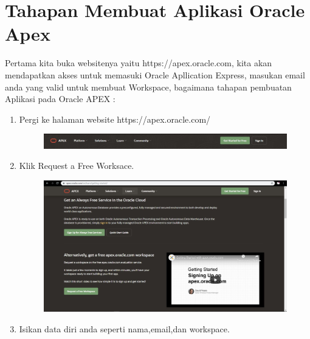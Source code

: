 \section{Tahapan Membuat Aplikasi Oracle Apex}
Pertama kita buka websitenya yaitu https://apex.oracle.com, kita akan mendapatkan akses untuk memasuki Oracle Apllication Express, masukan email anda yang valid untuk membuat Workspace,  bagaimana tahapan pembuatan Aplikasi pada Oracle APEX :
\begin{enumerate}
    \item Pergi ke halaman website https://apex.oracle.com/

\begin{figure}[!htbp]
    \centering
    \includegraphics[scale=0.4]{section/ica2.JPG}
    \label{gambar 1}
\end{figure}

    \item Klik Request a Free Worksace.
    
\begin{figure}[!htbp]
    \centering
    \includegraphics[scale=0.3]{section/ica3.JPG}
    \label{gambar 1}
\end{figure}
\vspace{3cm}
    \item Isikan data diri anda seperti nama,email,dan workspace.
    

\end{enumerate}
